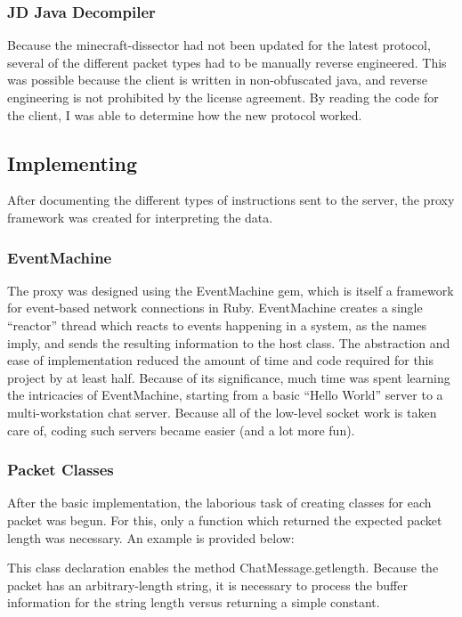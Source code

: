 \documentclass[12pt]{article}
\begin{document}
\subsubsection{JD Java Decompiler}
Because the minecraft-dissector had not been updated for the latest protocol, several of the different packet types had to be manually reverse engineered. This was possible because the client is written in non-obfuscated java, and reverse engineering is not prohibited by the license agreement. By reading the code for the client, I was able to determine how the new protocol worked.

\subsection{Implementing}
After documenting the different types of instructions sent to the server, the proxy framework was created for interpreting the data.

\subsubsection{EventMachine}
The proxy was designed using the EventMachine gem, which is itself a framework for event-based network connections in Ruby. EventMachine creates a single ``reactor'' thread which reacts to events happening in a system, as the names imply, and sends the resulting information to the host class. The abstraction and ease of implementation reduced the amount of time and code required for this project by at least half. Because of its significance, much time was spent learning the intricacies of EventMachine, starting from a basic ``Hello World'' server to a multi-workstation chat server. Because all of the low-level socket work is taken care of, coding such servers became easier (and a lot more fun).

\subsubsection{Packet Classes}
After the basic implementation, the laborious task of creating classes for each packet was begun. For this, only a function which returned the expected packet length was necessary. An example is provided below:

This class declaration enables the method ChatMessage.get\textunderscore{}length. Because the packet has an arbitrary-length string, it is necessary to process the buffer information for the string length versus returning a simple constant.
\end{document}
